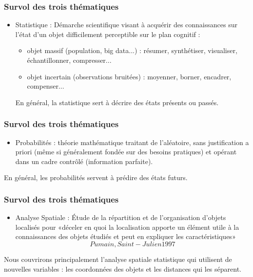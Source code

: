 \documentclass{beamer}
\begin{document}
\begin{frame}
\frametitle{Survol des trois thématiques}
\begin{itemize}
\item \alert{Statistique} : Démarche scientifique visant à acquérir des connaissances sur l'état d'un objet difficilement perceptible sur le plan cognitif : 
\begin{itemize}
\item objet \alert{massif} (population, big data...) : résumer, synthétiser, visualiser, échantillonner, compresser...
\item objet \alert{incertain} (observations bruitées) : moyenner, borner, encadrer, compenser... \newline \pause
\end{itemize}

En général, la statistique sert à  \alert{décrire} des états présents ou passés.


\end{itemize}
\end{frame}


\begin{frame}
\frametitle{Survol des trois thématiques}

\begin{itemize}
\item \alert{Probabilités} : théorie mathématique traitant de l'aléatoire, sans justification a priori (même si généralement fondée sur des besoins pratiques) et opérant dans un cadre contrôlé (information parfaite).
\newline \pause
\end{itemize}
En général, les probabilités servent à  \alert{prédire} des états futurs.
\end{frame}




\begin{frame}
\frametitle{Survol des trois thématiques}
\begin{itemize}
\item \alert{Analyse Spatiale} : Étude de la répartition et de l’organisation d’objets localisés pour «déceler en quoi la localisation apporte un élément utile à la connaissances des objets étudiés et peut en expliquer les caractéristiques» \[Pumain, Saint-Julien 1997\]
\newline \pause
\end{itemize}


Nous couvrirons principalement l'analyse spatiale \alert{statistique} qui utilisent de nouvelles variables : les coordonnées des objets et les distances  qui les séparent.
\end{frame}
\end{document}
